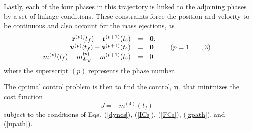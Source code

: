 \documentclass[10pt,final]{report}
\begin{document}
Lastly, each of the four phases in this trajectory is linked to the adjoining phases by a set of linkage conditions.  These constraints force the position and velocity to be continuous and also account for the mass ejections, as
\begin{equation}
\begin{array}{rcl}
{\bf r}^{(p)}(t_f)-{\bf r}^{(p+1)}(t_0) &=& {\bf 0}, \\
{\bf v}^{(p)}(t_f)-{\bf v}^{(p+1)}(t_0) &=& {\bf 0}, \qquad (p=1,\ldots,3)\\
m^{(p)}(t_f)-m_{dry}^{(p)}-m^{(p+1)}(t_0) &=& 0 \\
\end{array}
\end{equation}
where the superscript $(p)$ represents the phase number.

The optimal control problem is then to find the control, ${\bf u}$,
that minimizes the cost function
\begin{equation}
  J=-m^{(4)}(t_f)
\end{equation}
subject to the conditions of Eqs.~(\ref{dyncs}), (\ref{ICs}), (\ref{FCs}),
(\ref{xpath}), and (\ref{upath}).
\end{document}
